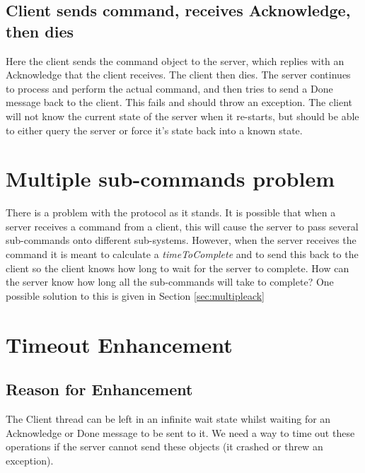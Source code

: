 \documentclass[10pt,a4paper]{article}
\begin{document}
\subsection{Client sends command, receives Acknowledge, then dies}
Here the client sends the command object to the server, which replies with an Acknowledge that the client receives.
The client then dies. The server continues to process and perform the actual command, and then tries to send a 
Done message back to the client. This fails and should throw an exception. The client will not know the
current state of the server when it re-starts, but should be able to either query the server or force it's state
back into a known state.

\section{Multiple sub-commands problem}
\label{sec:multiplesubcommandproblem}
There is a problem with the protocol as it stands. It is possible that when a server receives a command
from a client, this will cause the server to pass several sub-commands onto different sub-systems. However,
when the server receives the command it is meant to calculate a {\em timeToComplete} and to send this back 
to the client
so the client knows how long to wait for the server to complete. How can the server know how long all the
sub-commands will take to complete? One possible solution to this is given in Section \ref{sec:multipleack}


\section{Timeout Enhancement}
\label{sec:timout}
\subsection{Reason for Enhancement}
The Client thread can be left in an infinite wait state whilst waiting for an Acknowledge or Done message to
be sent to it. We need a way to time out these operations if the server cannot send these objects (it crashed
or threw an exception). 
\end{document}
